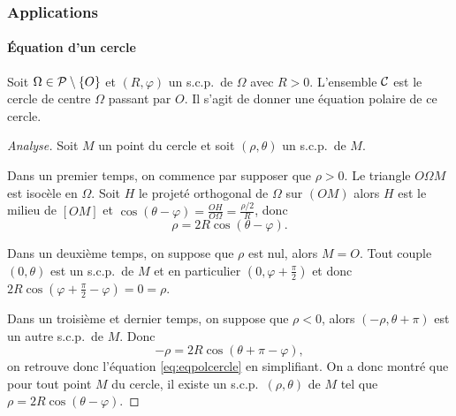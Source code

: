 \subsubsection{Applications}
\label{subsubsec:applicationeqcartetpol}

\paragraph{Équation d'un cercle}
\label{par:eqcercle}

Soit \(\Omega \in \P \setminus\{O\}\) et \((R , \varphi)\) un s.c.p.\ de 
\(\Omega\) avec \(R>0\). L'ensemble \(\courbe\) est le cercle de centre 
\(\Omega\) passant par \(O\). Il s'agit de donner une équation polaire de ce 
cercle.

\begin{proof}[Analyse]
  Soit \(M\) un point du cercle et soit \((\rho, \theta)\) un s.c.p.\ de \(M\). 

  Dans un premier temps, on commence par supposer que \(\rho >0\). Le triangle 
  \(O\Omega M\) est isocèle en \(\Omega\). Soit \(H\) le projeté orthogonal de 
  \(\Omega\) sur \((OM)\) alors \(H\) est le milieu de \([OM]\) et \(\cos(\theta 
  - \varphi) = \frac{OH}{O\Omega} = \frac{\rho/2}{R}\), donc
  \begin{equation}
    \label{eq:eqpolcercle}
    \rho = 2R \cos(\theta - \varphi).
  \end{equation}

  Dans un deuxième temps, on suppose que \(\rho\) est nul, alors \(M = O\).  
  Tout couple \((0 , \theta)\) est un s.c.p.\ de \(M\) et en particulier \((0 , 
  \varphi + \frac{\pi}{2})\) et donc \(2R \cos(\varphi + \frac{\pi}{2} - 
  \varphi) = 0 = \rho\). 

  Dans un troisième et dernier temps, on suppose que \(\rho <0\), alors 
  \((-\rho, \theta + \pi)\) est un autre s.c.p.\ de \(M\). Donc
  \begin{equation}
    -\rho = 2R \cos(\theta + \pi - \varphi),
  \end{equation}
  on retrouve donc l'équation \eqref{eq:eqpolcercle} en simplifiant. On a donc 
  montré que pour tout point \(M\) du cercle, il existe un s.c.p.\ \((\rho , 
  \theta)\) de \(M\) tel que \(\rho = 2R\cos(\theta - \varphi)\).
\end{proof}

